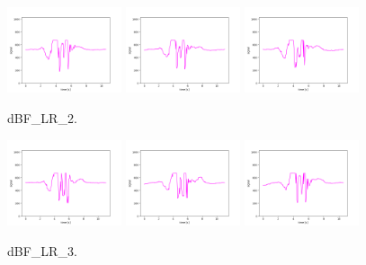 \begin{figure}[!ht]
\begin{center}
\includegraphics[width=0.3\textwidth]{../data/dBF_LR_2/dBF_LR_2_1.png}
\includegraphics[width=0.3\textwidth]{../data/dBF_LR_2/dBF_LR_2_2.png}
\includegraphics[width=0.3\textwidth]{../data/dBF_LR_2/dBF_LR_2_3.png}
\caption{dBF\_LR\_2.\label{fig:dBF_LR_2}}
\end{center}
\end{figure}

\begin{figure}[!ht]
\begin{center}
\includegraphics[width=0.3\textwidth]{../data/dBF_LR_3/dBF_LR_3_1.png}
\includegraphics[width=0.3\textwidth]{../data/dBF_LR_3/dBF_LR_3_2.png}
\includegraphics[width=0.3\textwidth]{../data/dBF_LR_3/dBF_LR_3_3.png}
\caption{dBF\_LR\_3.\label{fig:dBF_LR_3}}
\end{center}
\end{figure}

